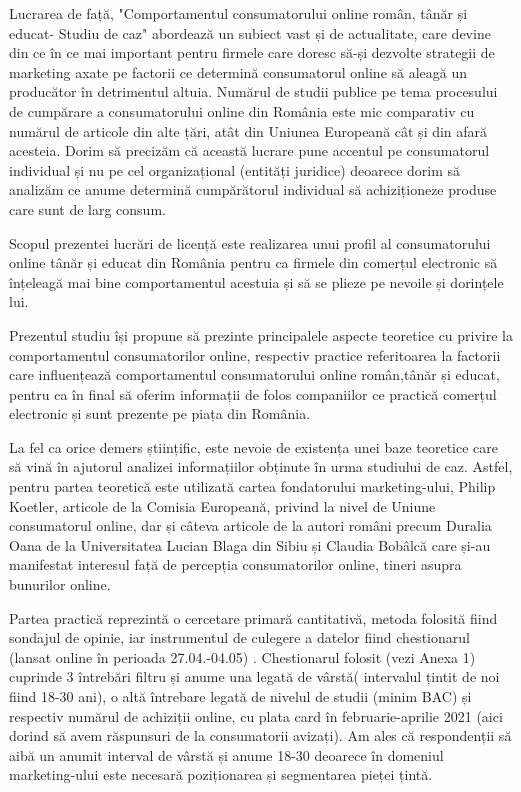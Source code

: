\documentclass[a4paper, 12pt]{article}
\begin{document}
	\quad\quad Lucrarea de față, "Comportamentul consumatorului online român, tânăr și educat- Studiu de caz" abordează un subiect vast și de actualitate, care devine din ce în ce mai important pentru firmele care doresc să-și dezvolte strategii de marketing axate pe factorii ce determină consumatorul online să aleagă un producător în detrimentul altuia. Numărul de studii publice pe tema procesului de cumpărare a consumatorului online din România este mic comparativ cu numărul de articole din alte țări, atât din Uniunea Europeană cât și din afară acesteia. Dorim să precizăm că această lucrare pune accentul pe consumatorul  individual și nu pe cel organizațional (entități juridice) deoarece dorim să analizăm ce anume determină cumpărătorul individual să achiziționeze produse care sunt de larg consum.
	
	\quad Scopul prezentei lucrări de licență este realizarea unui profil al consumatorului online tânăr și educat din România pentru ca firmele din comerțul electronic să înțeleagă mai bine comportamentul acestuia și să se plieze pe nevoile și dorințele lui.
	
	\quad Prezentul studiu își propune să prezinte principalele aspecte teoretice cu privire la comportamentul consumatorilor online, respectiv practice referitoarea la factorii care influențează comportamentul consumatorului online român,tânăr și educat, pentru ca în final să oferim informații de folos companiilor ce practică comerțul electronic și sunt prezente pe piața din România.
	
	\quad La fel ca orice demers științific, este nevoie de existența unei baze teoretice care să vină în ajutorul analizei informațiilor obținute în urma studiului de caz. Astfel, pentru partea teoretică este utilizată cartea fondatorului marketing-ului, Philip Koetler, articole de la Comisia Europeană, privind la nivel de Uniune consumatorul online, dar și câteva articole de la autori români precum Duralia Oana de la Universitatea Lucian Blaga din Sibiu și Claudia Bobâlcă care și-au manifestat interesul față de percepția consumatorilor online, tineri asupra bunurilor online. 
	
	\quad Partea practică reprezintă o cercetare primară cantitativă, metoda folosită fiind sondajul de opinie, iar instrumentul de culegere a datelor fiind chestionarul (lansat online în perioada 27.04.-04.05) . Chestionarul folosit (vezi Anexa 1) cuprinde 3 întrebări filtru și anume una legată de vârstă( intervalul țintit de noi fiind 18-30 ani), o altă întrebare legată de nivelul de studii (minim BAC) și respectiv numărul de achiziții online, cu plata card în februarie-aprilie 2021 (aici dorind să avem răspunsuri de la consumatorii avizați). Am ales că respondenții să aibă un anumit interval de vârstă și anume 18-30 deoarece în domeniul marketing-ului este necesară poziționarea și segmentarea pieței țintă.
	
\end{document}
